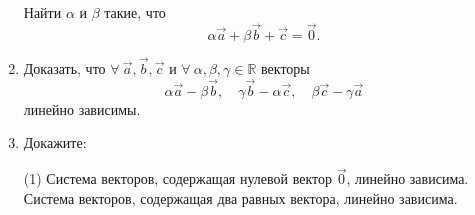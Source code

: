 \begin{enumerate}
	 Найти $\alpha$ и $\beta$ такие, что
	 $$\alpha \vec a + \beta \vec b + \vec c = \vec 0.$$
	 
	 \item Доказать, что $\forall\ {\vec a, \vec b, \vec c}$ и $\forall\ {\alpha, \beta, \gamma} \in \mathbb{R}$ векторы
	 $$\alpha \vec a - \beta \vec b,\quad \gamma \vec b -\alpha \vec c, \quad \beta \vec c - \gamma \vec a$$
	 линейно зависимы.
	 
	\item Докажите:
	\begin{tasks}(1)
		\task Система векторов, содержащая нулевой вектор $\vec 0$, линейно зависима.
		\task Система векторов, содержащая два равных вектора, линейно зависима.  
	\end{tasks}

\end{enumerate}